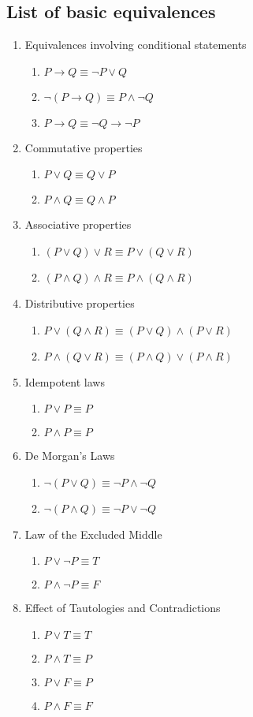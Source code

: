 \documentclass[letterpaper,12pt]{article}
\begin{document}
\subsection*{List of basic equivalences}
\begin{enumerate}
\item Equivalences involving conditional statements
\begin{enumerate}
 \item $P\to Q\equiv \neg P\vee Q$
 \item $\neg (P\to Q)\equiv P\wedge \neg Q$
 \item $P\to Q\equiv \neg Q\to \neg P$
\end{enumerate}
\item Commutative properties
\begin{enumerate}
\item $P \vee Q \equiv Q\vee P$
\item $P \wedge Q \equiv Q \wedge P$
\end{enumerate}
\item Associative properties
\begin{enumerate}
\item $(P\vee Q)\vee R \equiv P\vee (Q\vee R)$
\item $(P\wedge Q)\wedge R \equiv P\wedge (Q\wedge R)$
\end{enumerate}
\item Distributive properties
\begin{enumerate}
\item $P\vee (Q\wedge R) \equiv (P\vee Q)\wedge (P\vee R)$
\item $P\wedge (Q\vee R) \equiv (P\wedge Q)\vee (P\wedge R)$
\end{enumerate} 
\item Idempotent laws
\begin{enumerate}
\item $P \vee P \equiv P$
\item $P\wedge P \equiv P$
\end{enumerate}
\item De Morgan's Laws
\begin{enumerate}
\item $\neg (P\vee Q)\equiv \neg P \wedge \neg Q$
\item $\neg (P\wedge Q) \equiv \neg P \vee \neg Q$
\end{enumerate}
\item Law of the Excluded Middle
\begin{enumerate}
 \item $P\vee \neg P \equiv T$
 \item $P\wedge \neg P \equiv F$
\end{enumerate}
\item Effect of Tautologies and Contradictions
\begin{enumerate}
 \item $P\vee T \equiv T$
\item $P\wedge T \equiv P$
\item $P\vee F\equiv P$
\item $P\wedge F \equiv F$
\end{enumerate}
\end{enumerate}
\end{document}
